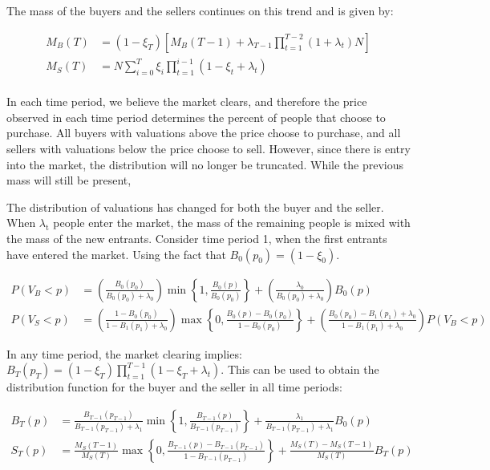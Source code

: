 \documentclass[12pt, letterpaper]{paper}
\begin{document}
The mass of the buyers and the sellers continues on this trend and is
given by:

\begin{align*}
M_B(T) &= ( 1 - \xi_T ) \left [ M_B(T-1) + \lambda_{T-1} \prod_{t=1}^{T-2}( 1 + \lambda_t )N \right ] \\
M_S(T) &= N \sum_{i = 0}^T \xi_i \prod_{t=1}^{i-1} ( 1- \xi_t + \lambda_t )\\
\end{align*}

In each time period, we believe the market clears, and therefore the
price observed in each time period determines the percent of people
that choose to purchase. All buyers with valuations above the price
choose to purchase, and all sellers with valuations below the price
choose to sell. However, since there is entry into the market, the
distribution will no longer be truncated. While the previous mass will
still be present, 

The distribution of valuations has changed for both the buyer and the
seller. When $\lambda$$_{\text{t}}$ people enter the market, the mass of the remaining
people is mixed with the mass of the new entrants. Consider time
period 1, when the first entrants have entered the market. Using the
fact that $B_0 (p_0) = (1-\xi_0)$.

\begin{align*}

P(V_B < p ) &= \left ( \frac{ B_0 ( p_0 ) }{ B_0 (p_0 ) + \lambda_0 } \right )
 \min \left \{ 1, \frac{ B_0 (p) }{ B_0 (p_0 ) } \right \}
 + \left ( \frac{\lambda_0 }{ B_0 (p_0 ) + \lambda_0 } \right ) B_0 (p) \\

P( V_S < p ) &= \left ( \frac{ 1 - B_0 (p_0 )}{ 1 - B_1(p_1 ) + \lambda_0} \right )
 \max \left \{ 0, \frac{ B_0(p) - B_0(p_0 ) }{1 - B_0 ( p_0 ) } \right \}
 + \left ( \frac{ B_0 (p_0 ) - B_1 (p_1) + \lambda_0 }{ 1 - B_1 (p_1) + \lambda_0 } \right ) P( V_B < p )
\end{align*}

In any time period, the market clearing implies: $B_T(p_T) = (1-\xi_T ) \prod_{t=1}^{T-1} (1-\xi_T +
\lambda_t )$. This can be used to obtain the distribution function for the
buyer and the seller in all time periods:

\begin{align*}
B_T (p) &= \frac{ B_{T-1 }(p_{T-1}) }{ B_{T-1 }(p_{T-1}) + \lambda_1 } \min \left \{ 1, \frac{ B_{T-1} ( p ) }{B_{T-1 }(p_{T-1 })} \right \}
 + \frac{ \lambda_1 }{ B_{T-1 }(p_{T-1}) + \lambda_1 } B_0 (p) \\
S_T (p) &= \frac{ M_S(T-1) }{ M_S(T) } \max \left \{ 0, \frac{ B_{T-1}(p) - B_{T-1}( p_{T-1} ) }{ 1 - B_{T-1} ( p_{T-1} ) } \right \} + \frac{ M_S(T) - M_S(T-1)_{} }{M_S(T)} B_T (p)\\
\end{align*} 
\end{document}

